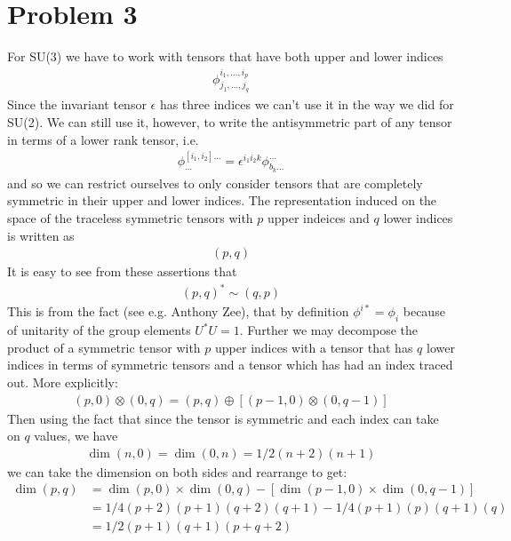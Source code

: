 \documentclass[a4paper,12pt]{article}
\begin{document}
\section*{Problem 3}
For SU(3) we have to work with tensors that have both upper and lower indices
\begin{equation}
	\begin{aligned}
		\phi^{i_1,\dots,i_p}_{j_1,\dots,j_q}
	\end{aligned}
\end{equation}
Since the invariant tensor $\epsilon$ has three indices we can't use it in the way we did for SU(2). We can still use it, however, to write the antisymmetric part of any tensor in terms of a lower rank tensor, i.e.
\begin{equation}
	\begin{aligned}
		\phi^{[i_1,i_2]\dots}_{\dots}=\epsilon^{i_1 i_2 k} \phi_{b_k\dots }^{\dots}
	\end{aligned}
\end{equation}
and so we can restrict ourselves to only consider tensors that are completely symmetric in their upper and lower indices. The representation induced on the space of the traceless symmetric tensors with $p$ upper indeices and $q$ lower indices is written as 
\begin{equation}
	\begin{aligned}
		(p,q)
	\end{aligned}
\end{equation}
It is easy to see from these assertions that 
\begin{equation}
	\begin{aligned}
		(p,q)^*\sim(q,p)
	\end{aligned}
\end{equation}
This is from the fact (see e.g. Anthony Zee), that by definition
$\phi^{i*}=\phi_i$ because of unitarity of the group elements $U^*U=1$. Further we may decompose the product of a symmetric tensor with $p$ upper indices with a tensor that has $q$ lower indices in terms of symmetric tensors and a tensor which has had an index traced out. More explicitly:
\begin{equation}
	\begin{aligned}
		(p,0)\otimes (0,q)=(p,q)\oplus \left[(p-1,0)\otimes (0,q-1)\right]
	\end{aligned}
\end{equation} 
Then using the fact that since the tensor is symmetric and each index can take on $q$ values, we have
\begin{equation}
	\begin{aligned}
		\dim(n,0)=\dim(0,n)=1/2(n+2)(n+1)
	\end{aligned}
\end{equation}
we can take the dimension on both sides and rearrange to get:
\begin{equation}
	\begin{aligned}
		\dim(p,q)&=\dim(p,0)\times \dim(0,q)-\left[\dim(p-1,0)\times \dim(0,q-1)\right]\\
		&=1/4(p+2)(p+1)(q+2)(q+1)-1/4(p+1)(p)(q+1)(q)\\
		&=1/2(p+1)(q+1)(p+q+2)
	\end{aligned}
\end{equation}
\end{document}
